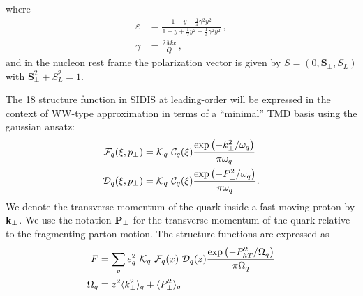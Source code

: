 \documentclass[floatfix,aps,prd,nofootinbib,superscriptaddress,preprint]{revtex4}
\newcommand\3[1]{\boldsymbol{#1}}
\newcommand{\bfkperp}{{\bf k}_\perp}
\newcommand{\bfpperp}{{\bf P}_\perp}
\newcommand{\Phperp}{P_{hT}}
\begin{document}
where
\begin{align}
\varepsilon &= \frac{1-y-\frac{1}{4}\gamma^2 y^2}{1-y+\frac{1}{2} y^2 + \frac{1}{4}\gamma^2 y^2}\, , \\
\gamma &=  \frac{2 M x}{Q} \, ,
\label{e.epsilon}
\end{align}
and in the nucleon rest frame the polarization vector is given by 
$S=(0,{\bm S}_\perp,S_L)$ with ${\bm S}_\perp^2+S_L^2=1$.

The 18 structure function in SIDIS at leading-order will be expressed
in the context of WW-type approximation in terms of a ``minimal''
TMD basis using the gaussian ansatz:
%
\begin{align}
{\cal F}_q(\xi,p_{\perp})&={\cal K}_q ~ {\cal C}_q(\xi) \frac{\exp\left(-k_{\perp}^2/\omega_q\right)}{\pi \omega_q}\\
{\cal D}_q(\xi,p_{\perp})&={\cal K}_q ~ {\cal C}_q(\xi) \frac{\exp\left(-P_{\perp}^2/\omega_q\right)}{\pi \omega_q}.
\end{align}
%
We denote the transverse momentum of the quark inside a fast moving
proton by $\bfkperp$. We use the notation $\bfpperp$ for the
transverse momentum of the quark relative to the fragmenting parton
motion. The structure functions are expressed as
%
\begin{align}
F&=\sum_q e_q^2 ~ {\cal K}_q ~ {\cal F}_q(x) ~{\cal D}_q(z) \frac{\exp\left(-\Phperp^2/\Omega_q\right)}{\pi \Omega_q}\\
\Omega_q&=z^2\avk + \avp
\end{align}

%
\end{document}
